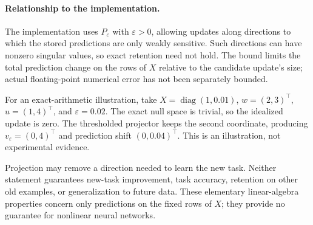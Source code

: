 \paragraph{Relationship to the implementation.}
The implementation uses $P_\varepsilon$ with $\varepsilon>0$, allowing
updates along directions to which the stored predictions are only weakly
sensitive. Such directions can have nonzero singular values, so exact
retention need not hold. The bound limits the total prediction change on
the rows of $X$ relative to the candidate update's size; actual
floating-point numerical error has not been separately bounded.

For an exact-arithmetic illustration, take $X=\operatorname{diag}(1,0.01)$,
$w=(2,3)^\top$, $u=(1,4)^\top$, and $\varepsilon=0.02$.
The exact null space is trivial, so the idealized update is zero.
The thresholded projector keeps the second coordinate, producing
$v_\varepsilon=(0,4)^\top$ and prediction shift $(0,0.04)^\top$.
This is an illustration, not experimental evidence.

Projection may remove a direction needed to learn the new task. Neither
statement guarantees new-task improvement, task accuracy, retention on
other old examples, or generalization to future data. These elementary
linear-algebra properties concern only predictions on the fixed rows of
$X$; they provide no guarantee for nonlinear neural networks.
